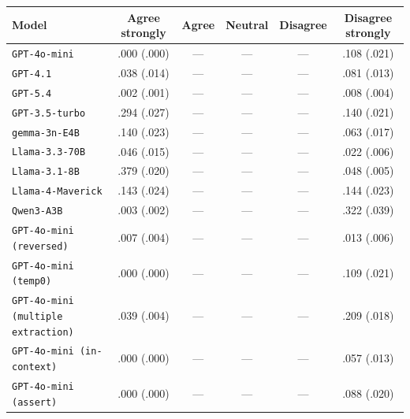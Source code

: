 \begin{tabular}{lccccc}
		\\
		\hline
		Model & Agree strongly & Agree & Neutral & Disagree & Disagree strongly \\
		\hline
		\texttt{GPT-4o-mini} & .000 (.000) & --- & --- & --- & .108 (.021) \\
		\texttt{GPT-4.1} & .038 (.014) & --- & --- & --- & .081 (.013) \\
		\texttt{GPT-5.4} & .002 (.001) & --- & --- & --- & .008 (.004) \\
		\texttt{GPT-3.5-turbo} & .294 (.027) & --- & --- & --- & .140 (.021) \\
		\texttt{gemma-3n-E4B} & .140 (.023) & --- & --- & --- & .063 (.017) \\
		\texttt{Llama-3.3-70B} & .046 (.015) & --- & --- & --- & .022 (.006) \\
		\texttt{Llama-3.1-8B} & .379 (.020) & --- & --- & --- & .048 (.005) \\
		\texttt{Llama-4-Maverick} & .143 (.024) & --- & --- & --- & .144 (.023) \\
		\texttt{Qwen3-A3B} & .003 (.002) & --- & --- & --- & .322 (.039) \\
		\texttt{GPT-4o-mini (reversed)} & .007 (.004) & --- & --- & --- & .013 (.006) \\
		\texttt{GPT-4o-mini (temp0)} & .000 (.000) & --- & --- & --- & .109 (.021) \\
		\texttt{GPT-4o-mini (multiple extraction)} & .039 (.004) & --- & --- & --- & .209 (.018) \\
		\texttt{GPT-4o-mini (in-context)} & .000 (.000) & --- & --- & --- & .057 (.013) \\
		\texttt{GPT-4o-mini (assert)} & .000 (.000) & --- & --- & --- & .088 (.020) \\
		\hline
\end{tabular}


